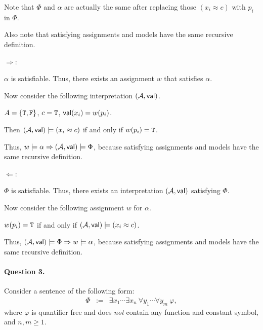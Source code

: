 \documentclass[11pt, a4paper]{article}
\begin{document}
\begin{framed}
\solution

    Note that $\Phi$ and $\alpha$ are actually the same after replacing those $(x_i\approx c)$ with $p_i$ in $\Phi$.

    Also note that satisfying assignments and models have the same recursive definition.

\noindent$\Rightarrow$:

    $\alpha$ is satisfiable.
    Thus, there exists an assignment $w$ that satisfies $\alpha$.

    Now consider the following interpretation $(\mathcal{A},\textsf{val})$.

    $A=\{{\tt T}, {\tt F}\}$, $c={\tt T}$, $\textsf{val}(x_i)=w(p_i)$.

    Then $(\mathcal{A},\textsf{val})\models(x_i\approx c)$ if and only if $w(p_i)={\tt T}$.

    Thus, $w\models\alpha\Rightarrow(\mathcal{A}, \textsf{val})\models\Phi$, because satisfying assignments and models have the same recursive definition.

\noindent$\Leftarrow$:

    $\Phi$ is satisfiable.
    Thus, there exists an interpretation $(\mathcal{A}, \textsf{val})$ satisfying $\Phi$.

    Now consider the following assignment $w$ for $\alpha$.

    $w(p_i)={\tt T}$ if and only if $(\mathcal{A}, \textsf{val})\models (x_i\approx c)$.

    Thus, $(\mathcal{A}, \textsf{val})\models \Phi \Rightarrow w \models \alpha$, because satisfying assignments and models have the same recursive definition.
\end{framed}

\paragraph*{Question 3.}
Consider a sentence of the following form:
\begin{eqnarray*}
\Phi & := & \exists x_1 \cdots \exists x_n \ \forall y_1 \cdots \forall y_m \ \varphi,
\end{eqnarray*}
where $\varphi$ is quantifier free and does {\em not} contain any function and constant symbol, and $n,m \geq 1$.
\end{document}
